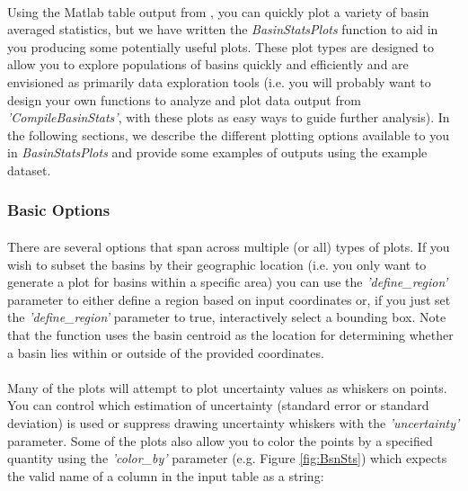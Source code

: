 \paragraph{}Using the Matlab table output from , you can quickly plot a variety of basin averaged statistics, but we have written the \textit{BasinStatsPlots} function to aid in you producing some potentially useful plots. These plot types are designed to allow you to explore populations of basins quickly and efficiently and are envisioned as primarily data exploration tools (i.e. you will probably want to design your own functions to analyze and plot data output from \textit{'CompileBasinStats'}, with these plots as easy ways to guide further analysis). In the following sections, we describe the different plotting options available to you in \textit{BasinStatsPlots} and provide some examples of outputs using the example dataset.

\subsubsection{Basic Options}
\paragraph{}There are several options that span across multiple (or all) types of plots. If you wish to subset the basins by their geographic location (i.e. you only want to generate a plot for basins within a specific area) you can use the \textit{'define\_region'} parameter to either define a region based on input coordinates or, if you just set the \textit{'define\_region'} parameter to true, interactively select a bounding box. Note that the function uses the basin centroid as the location for determining whether a basin lies within or outside of the provided coordinates.

\paragraph{}Many of the plots will attempt to plot uncertainty values as whiskers on points. You can control which estimation of uncertainty (standard error or standard deviation) is used or suppress drawing uncertainty whiskers with the \textit{'uncertainty'} parameter.  Some of the plots also allow you to color the points by a specified quantity using the \textit{'color\_by'} parameter (e.g. Figure \ref{fig:BsnSts}) which expects the valid name of a column in the input table as a string:

